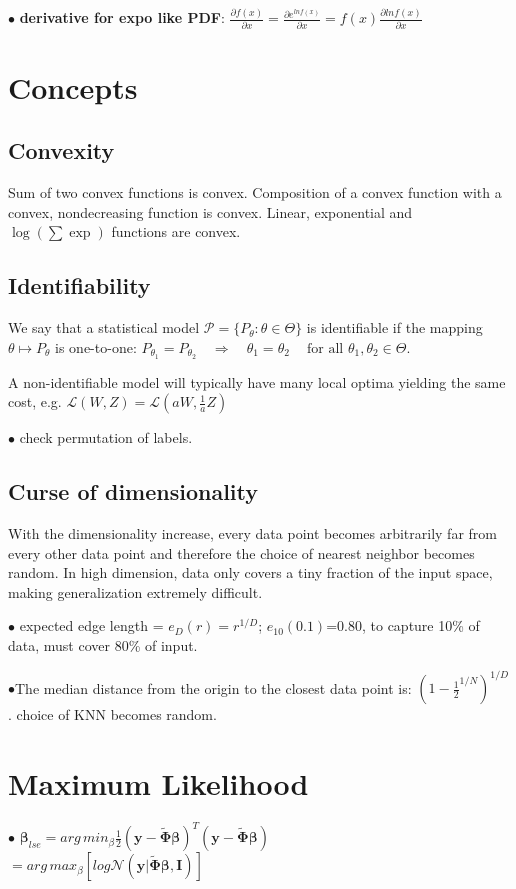 \documentclass[10pt,a4paper,landscape]{article}
\renewcommand{\bf}[1]{\ensuremath{\mathbf{#1}}}
\newcommand{\bbeta}{\boldsymbol\beta}
\newcommand{\bPhi}{\boldsymbol\Phi}
\begin{document}
\begin{multicols*}{6}
$\bullet$ \textbf{derivative for expo like PDF}: $\frac{\partial f(x)}{\partial x}=\frac{\partial e^{lnf(x)}}{\partial x}=f(x)\frac{\partial lnf(x)}{\partial x}$


\section{Concepts}

\subsection{Convexity}

Sum of two convex functions is convex. Composition of a convex function with a convex, nondecreasing function is convex. Linear, exponential and $\log(\sum \exp)$ functions are convex.



\subsection{Identifiability}
We say that a statistical model $\mathcal{P} = \{P_\theta: \theta \in \Theta\}$ is identifiable if the mapping $\theta \mapsto P_\theta$ is one-to-one:
$P_{\theta_1}=P_{\theta_2} \quad\Rightarrow\quad \theta_1=\theta_2 \quad\ \text{for all } \theta_1,\theta_2\in\Theta.$

A non-identifiable model will typically have many local optima yielding the same cost, e.g. $\mathcal{L}(W, Z) = \mathcal{L}(aW, \frac{1}{a} Z)$

$\bullet$ check permutation of labels.

\subsection{Curse of dimensionality}
With the dimensionality increase, every data point becomes arbitrarily far
from every other data point and therefore the choice of nearest neighbor becomes random.
In high dimension, data only covers a tiny fraction of the input space, making generalization extremely difficult.

$\bullet$ expected edge length = $e_D(r)=r^{1/D}$; $e_{10}(0.1)$=0.80, to capture 10\% of data, must cover 80\% of input.

$\bullet$The median distance from the origin to the closest data point is: $(1-\frac{1}{2}^{1/N})^{1/D}$. choice of KNN becomes random.


\section{Maximum Likelihood}
$\bullet$ $\bbeta_{lse} = arg \, min_\beta \frac{1}{2}(\bf{y}-\tilde{\bPhi}\bbeta)^T(\bf{y}-\tilde{\bPhi}\bbeta)$\\
$=arg \, max_\beta[log\mathcal{N}(\bf{y}|\tilde{\bPhi}\bbeta,\bf{I})]$


\end{multicols*}
\end{document}
